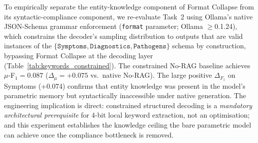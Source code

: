 
To empirically separate the entity-knowledge component of Format Collapse
from its syntactic-compliance component, we re-evaluate Task~2 using
Ollama's native JSON-Schema grammar enforcement (\texttt{format} parameter;
Ollama $\geq$0.1.24), which constrains the decoder's sampling distribution
to outputs that are valid instances of the
$\{\texttt{Symptoms},\texttt{Diagnostics},\texttt{Pathogens}\}$ schema
by construction, bypassing Format Collapse at the decoding layer
(Table~\ref{tab:keywords_constrained}).
The constrained No-RAG baseline achieves $\mu$-F$_1 = 0.087$
($\Delta_\mu = +0.075$ vs.\ native No-RAG).
The large positive $\Delta_{{F_1}}$ on Symptoms (+0.074) confirms that entity knowledge was present in the model's parametric memory but syntactically inaccessible under native generation.
The engineering implication is direct: constrained structured decoding is
a \emph{mandatory architectural prerequisite} for 4-bit local keyword
extraction, not an optimisation; and this experiment establishes the knowledge
ceiling the bare parametric model can achieve once the compliance bottleneck
is removed.
